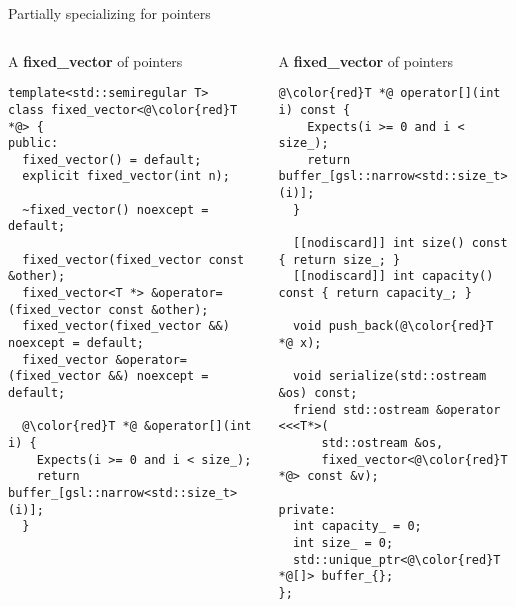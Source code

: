 \begin{frame}[t,fragile,shrink=20]{Partially specializing for pointers}

\begin{columns}[T]

\begin{block}{A \textbf{fixed\_vector} of pointers}
\begin{lstlisting}[escapechar=@]
template<std::semiregular T>
class fixed_vector<@\color{red}T *@> {
public:
  fixed_vector() = default;
  explicit fixed_vector(int n);

  ~fixed_vector() noexcept = default;

  fixed_vector(fixed_vector const &other);
  fixed_vector<T *> &operator=(fixed_vector const &other);
  fixed_vector(fixed_vector &&) noexcept = default;
  fixed_vector &operator=(fixed_vector &&) noexcept = default;

  @\color{red}T *@ &operator[](int i) {
    Expects(i >= 0 and i < size_);
    return buffer_[gsl::narrow<std::size_t>(i)];
  }
\end{lstlisting}
\end{block}

\begin{block}{A \textbf{fixed\_vector} of pointers}
\begin{lstlisting}[escapechar=@]
  @\color{red}T *@ operator[](int i) const {
    Expects(i >= 0 and i < size_);
    return buffer_[gsl::narrow<std::size_t>(i)];
  }

  [[nodiscard]] int size() const { return size_; }
  [[nodiscard]] int capacity() const { return capacity_; }

  void push_back(@\color{red}T *@ x);

  void serialize(std::ostream &os) const;
  friend std::ostream &operator <<<T*>(
      std::ostream &os, 
      fixed_vector<@\color{red}T *@> const &v);

private:
  int capacity_ = 0;
  int size_ = 0;
  std::unique_ptr<@\color{red}T *@[]> buffer_{};
};
\end{lstlisting}
\end{block}

\end{columns}
\end{frame}

